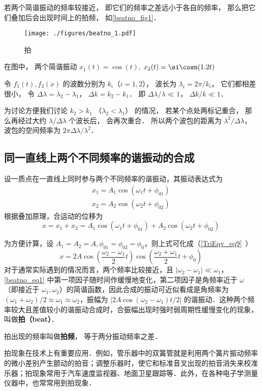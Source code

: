 
\begin{issues}
\issueDraft
\end{issues}


若两个简谐振动的频率较接近， 即它们的频率之差远小于各自的频率， 那么把它们叠加后会出现时间上的拍频， 如\autoref{beatno_fig1}．
\begin{figure}[ht]
\centering
\texttt{[image: ./figures/beatno\_1.pdf]}
\caption{拍} \label{beatno_fig1}
\end{figure}
在图中， 两个简谐振动 $x_1(t) = \cos(t)$, $x_2(t) = \si\cosn(1.2t)$



令 $f_1(t), f_2(x)$ 的波数分别为 $k_i$（$i=1,2$）， 波长为 $\lambda_i = 2\pi/k_i$， 它们都相差很小， 令 $\Delta \lambda = \lambda_2 - \lambda_1$， $\Delta k = k_2 - k_1$． 即 $\Delta \lambda/\lambda \ll 1$， $\Delta k/k \ll 1$．

为讨论方便我们讨论 $k_2 > k_1$ （$\lambda_2 < \lambda_1$） 的情况， 若某个点处两标记重合， 那么再经过大约 $\lambda/\Delta\lambda$ 个波长后， 会再次重合． 所以两个波包的距离为 $\lambda^2/\Delta\lambda$， 波包的空间频率为 $2\pi \Delta \lambda/\lambda^2$．


\subsection{同一直线上两个不同频率的谐振动的合成}

设一质点在一直线上同时参与两个不同频率的谐振动，其振动表达式为
\begin{equation}
\begin{array}{l}x_{1}=A_{1} \cos \left(\omega_{1} t+\phi_{01}\right) \\ x_{2}=A_{2} \cos \left(\omega_{2} t+\phi_{02}\right)\end{array}
\end{equation}
根据叠加原理，合运动的位移为
\begin{equation}
x=x_{1}+x_{2}=A_{1} \cos \left(\omega_{1} t+\phi_{01}\right)+A_{2} \cos \left(\omega_{2} t+\phi_{02}\right)
\end{equation}

为方便计算，设 $A_1=A_2=A,\phi_{01}=\phi_{02}=\phi_{0}$，则上式可化成（\autoref{TriEqv_eq9}~）
\begin{equation} \label{beatno_eq1}
x=2 A \cos \left(\frac{\omega_{2}-\omega_{1}}{2} t\right) \cos \left(\frac{\omega_{2}+\omega_{1}}{2} t+\phi_{0}\right)
\end{equation}
对于通常实际遇到的情况而言，两个频率比较接近，且 $\left|\omega_{2}-\omega_{1}\right|\ll \omega_1$，\autoref{beatno_eq1} 中第一项因子随时间作缓慢地变化，第二项因子是角频率近于 $\omega$（即接近于 $\omega_1,\omega_2$）的简谐函数，因此合成的振动可近似看成是角频率为 $(\omega_{1}+\omega_{2})/2 \approx \omega_{1} \approx \omega_{2}$，振幅为 $\left | 2 A \cos (\omega_{2}-\omega_{1})t/{2} \right |$ 的谐振动．这种两个频率较大且差值较小的谐振动合成时，合振幅出现时强时弱周期性缓慢变化的现象，叫做\textbf{拍（beat）}．


拍出现的频率叫做\textbf{拍频}， 等于两分振动频率之差．

拍现象在技术上有重要应用．例如，管乐器中的双簧管就是利用两个簧片振动频率的微小差别产生颤动的拍音；调整乐器时，使它和标准音叉出现的拍音消失来校准乐器；拍现象常用于汽车速度监视器、地面卫星跟踪等．此外，在各种电子学测量仪器中，也常常用到拍现象．